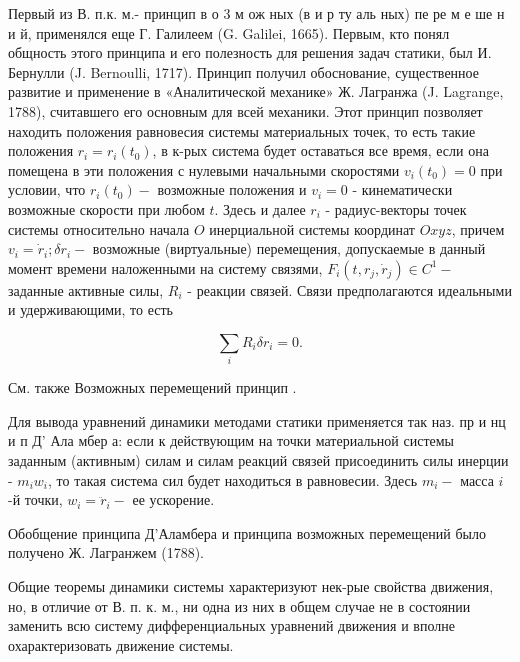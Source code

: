 \documentclass[10pt]{article}
\begin{document}
Первый из В. п.к. м.- принцип в о 3 м ож ных (в и р ту аль ных) пе ре м е ше н и й, применялся еще Г. Галилеем (G. Galilei, 1665). Первым, кто понял общность этого принципа и его полезность для решения задач статики, был И. Бернулли (J. Bernoulli, 1717). Принцип получил обоснование, существенное развитие и применение в «Аналитической механике» Ж. Лагранжа (J. Lagrange, 1788), считавшего его основным для всей механики. Этот принцип позволяет находить положения равновесия системы материальных точек, то есть такие положения $r_{i}=r_{i}\left(t_{0}\right)$, в к-рых система будет оставаться все время, если она помещена в эти положения с нулевыми начальными скоростями $v_{i}\left(t_{0}\right)=0$ при условии, что $r_{i}\left(t_{0}\right)-$ возможные положения и $v_{i}=0$ - кинематически возможные скорости при любом $t$. Здесь и далее $r_{i}$ - радиус-векторы точек системы относительно начала $O$ инерциальной системы координат $O x y z$, причем $v_{i}=\dot{r}_{i} ; \delta r_{i}-$ возможные (виртуальные) перемещения, допускаемые в данный момент времени наложенными на систему связями, $F_{i}\left(t, r_{j}, \dot{r}_{j}\right) \in C^{1}-$ заданные активные силы, $R_{i}$ - реакции связей. Связи предполагаются идеальными и удерживающими, то есть



\[

\sum_{i} R_{i} \delta r_{i}=0 .

\]



См. также Возможных перемещений принцип .



Для вывода уравнений динамики методами статики применяется так наз. пр и нц и п Д' Ала мбер а: если к действующим на точки материальной системы заданным (активным) силам и силам реакций связей присоединить силы инерции - $m_{i} w_{i}$, то такая система сил будет находиться в равновесии. Здесь $m_{i}-$ масса $i$-й точки, $w_{i}=\ddot{r}_{i}-$ ее ускорение.



Обобщение принципа Д'Аламбера и принципа возможных перемещений было получено Ж. Лагранжем (1788).



Общие теоремы динамики системы характеризуют нек-рые свойства движения, но, в отличие от В. п. к. м., ни одна из них в общем случае не в состоянии заменить всю систему дифференциальных уравнений движения и вполне охарактеризовать движение системы.
\end{document}
